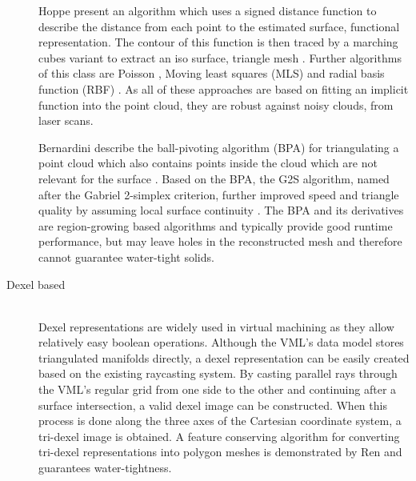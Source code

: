 \begin{description}
	Hoppe \etal present an algorithm which uses a signed distance function to describe the distance from each point to the estimated surface, \ie functional representation.
	The contour of this function is then traced by a marching cubes variant to extract an iso surface, \ie triangle mesh \cite{sdf_surface_reconstruction}.
	Further algorithms of this class are Poisson \cite{poisson}, Moving least squares (MLS) \cite{mls} and radial basis function (RBF) \cite{rbf}.
	As all of these approaches are based on fitting an implicit function into the point cloud, they are robust against noisy clouds, \eg from laser scans.
	
	Bernardini \etal describe the ball-pivoting algorithm (BPA) for triangulating a point cloud which also contains points inside the cloud which are not relevant for the surface \cite{bpa}.
	Based on the BPA, the G2S algorithm, named after the Gabriel 2-simplex criterion, further improved speed and triangle quality by assuming local surface continuity \cite{g2s}.
	The BPA and its derivatives are region-growing based algorithms and typically provide good runtime performance, but may leave holes in the reconstructed mesh and therefore cannot guarantee water-tight solids.
		
	\item[Dexel based] \hfill \\
	Dexel representations are widely used in virtual machining as they allow  relatively easy boolean operations.
	Although the VML's data model stores triangulated manifolds directly, a dexel representation can be easily created based on the existing raycasting system.
	By casting parallel rays through the VML's regular grid from one side to the other and continuing after a surface intersection, a valid dexel image can be constructed.
	When this process is done along the three axes of the Cartesian coordinate system, a tri-dexel image is obtained.
	A feature conserving algorithm for converting tri-dexel representations into polygon meshes is demonstrated by Ren \etal \cite{tridexel_reconstruction} and guarantees water-tightness.
	

\end{description}
